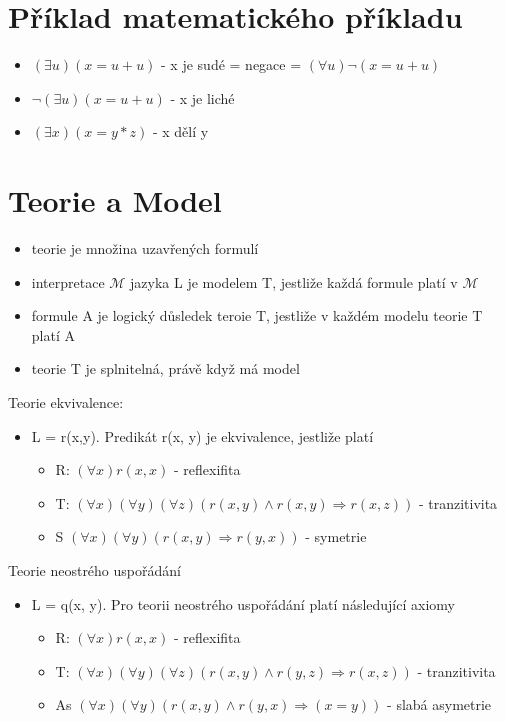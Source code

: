 \documentclass{szzclass}
\begin{document}
\section{Příklad matematického příkladu}
\begin{itemize}
  \item $(\exists{u})(x = u + u)$ - x je sudé = negace = $(\forall{u})\neg(x = u + u)$
  \item $\neg(\exists{u})(x = u + u)$ - x je liché
  \item $(\exists{x})(x = y*z)$ - x dělí y
\end{itemize}
\section{Teorie a Model}
\begin{itemize}
  \item teorie je množina uzavřených formulí
  \item interpretace $\mathcal{M}$ jazyka L je modelem T, jestliže každá formule platí v $\mathcal{M}$
  \item formule A je logický důsledek teroie T, jestliže v každém modelu teorie T platí A
  \item teorie T je splnitelná, právě když má model
\end{itemize}
Teorie ekvivalence:
\begin{itemize}
  \item L = {r(x,y)}. Predikát r(x, y) je ekvivalence, jestliže platí
  \begin{itemize}
    \item R: $(\forall{x}) r(x,x)$ - reflexifita
    \item T: $(\forall{x})(\forall{y})(\forall{z})(r(x,y) \wedge r(x,y) \Rightarrow r(x,z))$ - tranzitivita
    \item S $(\forall{x})(\forall{y})(r(x,y) \Rightarrow r(y,x))$ - symetrie
  \end{itemize}
\end{itemize}
Teorie neostrého uspořádání
\begin{itemize}
  \item L = {q(x, y)}. Pro teorii neostrého uspořádání platí následující axiomy
  \begin{itemize}
    \item R: $(\forall{x}) r(x,x)$ - reflexifita
    \item T: $(\forall{x})(\forall{y})(\forall{z})(r(x,y) \wedge r(y,z) \Rightarrow r(x,z))$ - tranzitivita
    \item As $(\forall{x})(\forall{y})(r(x,y) \wedge r(y,x) \Rightarrow (x = y))$ - slabá asymetrie
  \end{itemize}
\end{itemize}
\end{document}
